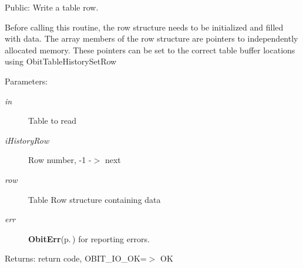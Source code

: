 Public: Write a table row. 

Before calling this routine, the row structure needs to be initialized and filled with data. The array members of the row structure are pointers to independently allocated memory. These pointers can be set to the correct table buffer locations using Obit\-Table\-History\-Set\-Row \begin{Desc}
\item[Parameters:]
\begin{description}
\item[{\em in}]Table to read \item[{\em i\-History\-Row}]Row number, -1 -$>$ next \item[{\em row}]Table Row structure containing data \item[{\em err}]{\bf Obit\-Err}{\rm (p.\,\pageref{structObitErr})} for reporting errors. \end{description}
\end{Desc}
\begin{Desc}
\item[Returns:]return code, OBIT\_\-IO\_\-OK=$>$ OK \end{Desc}
